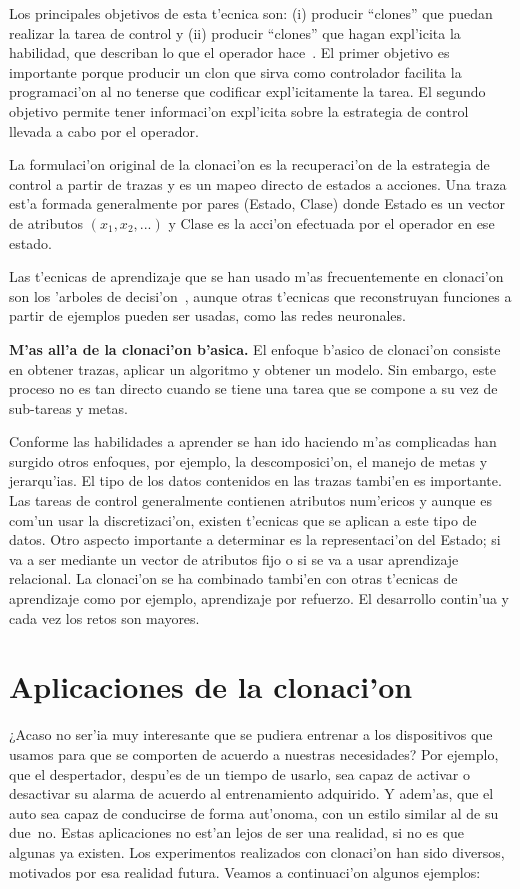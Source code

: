 \documentclass[11pt]{article}
\begin{document}
Los principales objetivos de esta t'ecnica son: (i) producir ``clones'' que puedan realizar la tarea de control y (ii) producir ``clones'' que hagan expl'icita la habilidad, que describan lo que el operador hace~\cite{modellingskills}. El primer objetivo es importante porque producir un clon que sirva como controlador facilita la programaci'on al no tenerse que codificar expl'icitamente la tarea. El segundo objetivo permite tener informaci'on expl'icita sobre la estrategia de control llevada a cabo por el operador. 

La formulaci'on original de la \textsf{clonaci'on} es la recuperaci'on de la estrategia de control a partir de trazas y es un mapeo directo de estados a acciones. Una traza est'a formada generalmente por pares (Estado, Clase) donde Estado es un vector de atributos $(x_1,x_2,...)$ y Clase es la acci'on efectuada por el operador en ese estado. 

Las t'ecnicas de aprendizaje que se han usado m'as frecuentemente en \textsf{clonaci'on} son los \textsf{'arboles de decisi'on}~\cite{quinlan1986}, aunque otras t'ecnicas que reconstruyan funciones a partir de ejemplos pueden ser usadas, como las redes neuronales.

\medskip
\noindent

\textbf{M'as all'a de la clonaci'on b'asica.}
El enfoque b'asico de clonaci'on consiste en obtener trazas, aplicar un algoritmo y obtener un modelo. Sin embargo, este proceso no es tan directo cuando se tiene una tarea que se compone a su vez de sub-tareas y metas.

Conforme las habilidades a aprender se han ido haciendo m'as complicadas han surgido otros enfoques, por ejemplo, la descomposici'on, el manejo de metas y jerarqu'ias. El tipo de los datos contenidos en las trazas tambi'en es importante. Las tareas de control generalmente contienen atributos num'ericos y aunque es com'un usar la discretizaci'on, existen t'ecnicas que se aplican a este tipo de datos. Otro aspecto importante a determinar es la representaci'on del Estado; si va a ser mediante un vector de atributos fijo o si se va a usar aprendizaje relacional. La clonaci'on se ha combinado tambi'en con otras t'ecnicas de aprendizaje como por ejemplo, aprendizaje por refuerzo. El desarrollo contin'ua y cada vez los retos son mayores.


\section{Aplicaciones de la clonaci'on}
\textquestiondown ¿Acaso no ser'ia muy interesante que se pudiera entrenar a los dispositivos que usamos para que se comporten de acuerdo a nuestras necesidades? Por ejemplo, que el despertador, despu'es de un tiempo de usarlo, sea capaz de activar o desactivar su alarma de acuerdo al entrenamiento adquirido. Y adem'as, que el auto sea capaz de conducirse de forma aut'onoma, con un estilo similar al de su due~no. Estas aplicaciones no est'an lejos de ser una realidad, si no es que algunas ya existen. Los experimentos realizados con clonaci'on han sido diversos, motivados por esa realidad futura. Veamos a continuaci'on algunos ejemplos:
\medskip
\noindent
\end{document}
